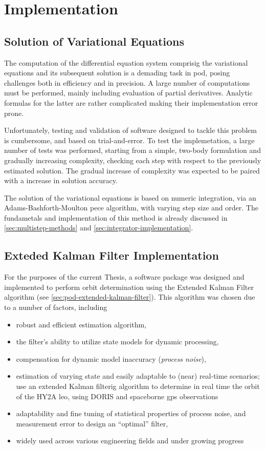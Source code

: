 \section{Implementation}\label{sec:pod-implementation}

\subsection{Solution of Variational Equations}\label{ssec:vareq-implementation}
The computation of the differential equation system comprisig the variational 
equations and its subsequent solution is a demading task in \gls{pod}, posing 
challenges both in efficiency and in precision. A large number of computations 
must be performed, mainly including evaluation of partial derivatives. Analytic 
formulas for the latter are rather complicated making their implementation error 
prone.

Unfortunately, testing and validation of software designed to tackle this problem 
is cumbersome, and based on trial-and-error. To test the implemetation, a large 
number of tests was performed, starting from a simple, two-body formulation and 
gradually increasing complexity, checking each step with respect to the previously 
estimated solution. The gradual increase of complexity was expected to be paired with 
a increase in solution accuracy.

The solution of the variational equations is based on numeric integration, via an 
Adams-Bashforth-Moulton \gls{pece} algorithm, with varying step size and order. The 
fundametals and implementation of this method is already discussed in \autoref{sec:multistep-methods} 
and \autoref{sec:integrator-implementation}.

\subsection{Exteded Kalman Filter Implementation}\label{ssec:ekf-implementation}
For the purposes of the current Thesis, a software package was designed and 
implemented to perform orbit determination using the Extended Kalman Filter 
algorithm (see \autoref{sec:pod-extended-kalman-filter}). This algorithm was 
chosen due to a number of factors, including
\begin{itemize}
  \item robust and efficient estimation algorithm,
  \item the filter's ability to utilize state models for dynamic processing,
  \item compensation for dynamic model inaccuracy (\emph{process noise}),
  \item estimation of varying state and easily adaptable to (near) real-time scenarios; 
    \cite{Zhou2020} use an extended Kalman filterig algorithm to determine in real time 
    the orbit of the HY2A \gls{leo}, using DORIS and spaceborne \gls{gps} 
    observations
  \item adaptability and fine tuning of statistical properties of process noise, 
    and measurement error to design an ``optimal'' filter,
  \item widely used across various engineering fields and under growing progress
\end{itemize}

